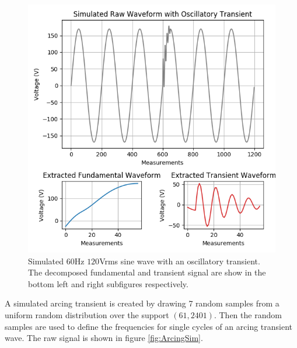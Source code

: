 \documentclass[10pt, conference, compsocconf]{IEEEtran}
\begin{document}
\begin{figure}[h]
\centering%
\includegraphics[scale=0.35]{./figures/oscillatory_sim.png}
\caption{Simulated $60$Hz $120$Vrms sine wave with an oscillatory transient. The decomposed fundamental and transient signal are show in the bottom left and right subfigures respectively.}\label{fig:OscillatorySim}
\end{figure}

A simulated arcing transient is created by drawing 7 random samples from a uniform random distribution over the support $(61, 2401)$. Then the random samples are used to define the frequencies for single cycles of an arcing transient wave. The raw signal is shown in figure \ref{fig:ArcingSim}.
\end{document}
